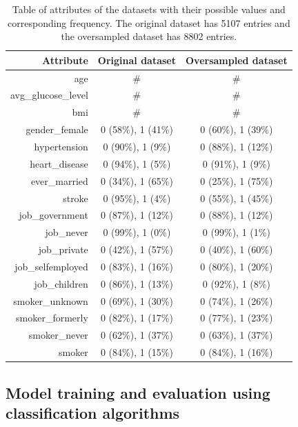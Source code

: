 \begin{table}[H]
\centering \begin{tabular}{rcc}
\textbf{Attribute} & \textbf{Original dataset} & \textbf{Oversampled dataset}\\\hline\hline
age                & \#           & \# \\
avg\_glucose\_level& \#           & \# \\
bmi                & \#           & \# \\
gender\_female     & 0 (58\%), 1 (41\%) & 0 (60\%), 1 (39\%) \\
hypertension       & 0 (90\%), 1 (9\%)  & 0 (88\%), 1 (12\%) \\
heart\_disease     & 0 (94\%), 1 (5\%)  & 0 (91\%), 1 (9\%) \\
ever\_married      & 0 (34\%), 1 (65\%) & 0 (25\%), 1 (75\%) \\
stroke             & 0 (95\%), 1 (4\%)  & 0 (55\%), 1 (45\%) \\
job\_government    & 0 (87\%), 1 (12\%) & 0 (88\%), 1 (12\%) \\
job\_never         & 0 (99\%), 1 (0\%)  & 0 (99\%), 1 (1\%) \\
job\_private       & 0 (42\%), 1 (57\%) & 0 (40\%), 1 (60\%) \\
job\_selfemployed  & 0 (83\%), 1 (16\%) & 0 (80\%), 1 (20\%) \\
job\_children      & 0 (86\%), 1 (13\%) & 0 (92\%), 1 (8\%) \\
smoker\_unknown    & 0 (69\%), 1 (30\%) & 0 (74\%), 1 (26\%) \\
smoker\_formerly   & 0 (82\%), 1 (17\%) & 0 (77\%), 1 (23\%) \\
smoker\_never      & 0 (62\%), 1 (37\%) & 0 (63\%), 1 (37\%) \\
smoker             & 0 (84\%), 1 (15\%) & 0 (84\%), 1 (16\%) \\
\end{tabular}
\caption{Table of attributes of the datasets with their possible values and corresponding frequency. The original dataset has 5107 entries and the oversampled dataset has 8802 entries.}
\label{}
\end{table}

\subsection{Model training and evaluation using classification algorithms}

